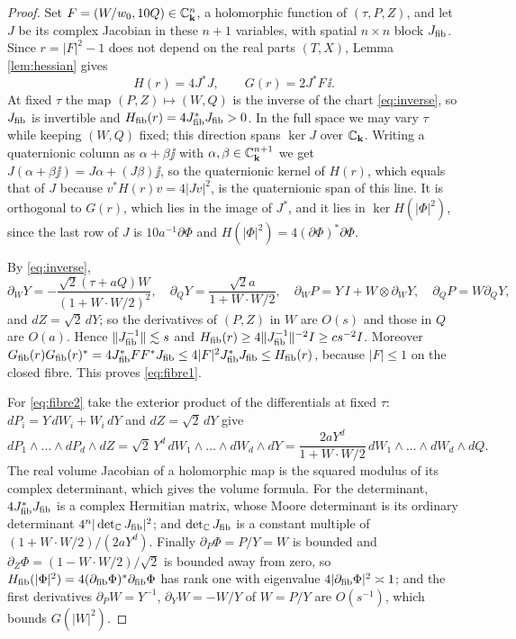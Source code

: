 \begin{proof}
Set $F=(W/w_0,10Q)\in\mathbb{C}_{\mathbf k}^n$, a holomorphic function of $(\tau,P,Z)$, and let $J$ be its complex
Jacobian in these $n+1$ variables, with spatial $n\times n$ block $J_{\rm fib}$. Since
$r=|F|^2-1$ does not depend on the real parts $(T,X)$, Lemma \ref{lem:hessian} gives
\[
H(r)=4J^*J,\qquad G(r)=2J^*F\,\ii .
\]
At fixed $\tau$ the map $(P,Z)\mapsto(W,Q)$ is the inverse of the chart \eqref{eq:inverse}, so
$J_{\rm fib}$ is invertible and $H_{\mathrm{fib}}(r)=4J_{\rm fib}^*J_{\rm fib}>0$. In the full space we may vary
$\tau$ while keeping $(W,Q)$ fixed; this direction spans $\ker J$ over $\mathbb{C}_{\mathbf k}$. Writing a
quaternionic column as $\alpha+\beta\jj$ with $\alpha,\beta\in\mathbb{C}_{\mathbf k}^{n+1}$ we get
$J(\alpha+\beta\jj)=J\alpha+(J\beta)\jj$, so the quaternionic kernel of $H(r)$, which equals that of
$J$ because $v^*H(r)v=4|Jv|^2$, is the quaternionic span of this line. It is orthogonal to
$G(r)$, which lies in the image of $J^*$, and it lies in $\ker H(|\Phi|^2)$, since the last
row of $J$ is $10a^{-1}\partial\Phi$ and $H(|\Phi|^2)=4(\partial\Phi)^*\partial\Phi$.

By \eqref{eq:inverse},
\[
\partial_WY=-\frac{\sqrt2(\tau+aQ)W}{(1+W\cdot W/2)^2},\quad
\partial_QY=\frac{\sqrt2a}{1+W\cdot W/2},\quad
\partial_WP=Y\,I+W\otimes\partial_WY,\quad\partial_QP=W\partial_QY,
\]
and $dZ=\sqrt2\,dY$; so the derivatives of $(P,Z)$ in $W$ are $O(s)$ and those in $Q$ are $O(a)$.
Hence $\|J_{\rm fib}^{-1}\|\lesssim s$ and $H_{\mathrm{fib}}(r)\ge4\|J_{\rm fib}^{-1}\|^{-2}I\ge cs^{-2}I$. Moreover
$G_{\mathrm{fib}}(r)G_{\mathrm{fib}}(r)^*=4J_{\rm fib}^*FF^*J_{\rm fib}\le4|F|^2J_{\rm fib}^*J_{\rm fib}\le H_{\mathrm{fib}}(r)$, because
$|F|\le1$ on the closed fibre. This proves \eqref{eq:fibre1}.

For \eqref{eq:fibre2} take the exterior product of the differentials at fixed $\tau$:
$dP_i=Y\,dW_i+W_i\,dY$ and $dZ=\sqrt2\,dY$ give
\[
dP_1\wedge\dots\wedge dP_d\wedge dZ=\sqrt2\,Y^d\,dW_1\wedge\dots\wedge dW_d\wedge dY
=\frac{2aY^d}{1+W\cdot W/2}\,dW_1\wedge\dots\wedge dW_d\wedge dQ .
\]
The real volume Jacobian of a holomorphic map is the squared modulus of its complex
determinant, which gives the volume formula. For the determinant, $4J_{\rm fib}^*J_{\rm fib}$ is a
complex Hermitian matrix, whose Moore determinant is its ordinary determinant
$4^n|\det_{\mathbb{C}}J_{\rm fib}|^2$; and $\det_{\mathbb{C}}J_{\rm fib}$ is a constant multiple of
$(1+W\cdot W/2)/(2aY^d)$. Finally $\partial_P\Phi=P/Y=W$ is bounded and
$\partial_Z\Phi=(1-W\cdot W/2)/\sqrt2$ is bounded away from zero, so
$H_{\mathrm{fib}}(|\Phi|^2)=4(\partial_{\rm fib}\Phi)^*\partial_{\rm fib}\Phi$ has rank one with eigenvalue
$4|\partial_{\rm fib}\Phi|^2\asymp1$; and the first derivatives $\partial_PW=Y^{-1}$,
$\partial_YW=-W/Y$ of $W=P/Y$ are $O(s^{-1})$, which bounds $G(|W|^2)$.
\end{proof}

